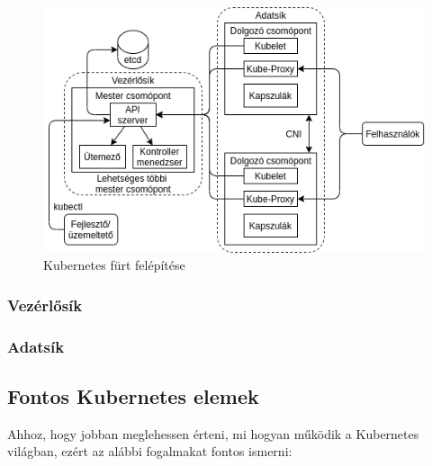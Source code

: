 \begin{figure}[!ht]
	\centering
	\includegraphics[width=1\textwidth, keepaspectratio]{figures/k8s_architecture.png}
	\caption{Kubernetes fürt felépítése}
	\label{fig:HVSpaces}
\end{figure}

\subsubsection{Vezérlősík}


\subsubsection{Adatsík}

\subsection{Fontos Kubernetes elemek}

Ahhoz, hogy jobban meglehessen érteni, mi hogyan működik a Kubernetes világban,
ezért az alábbi fogalmakat fontos ismerni:

